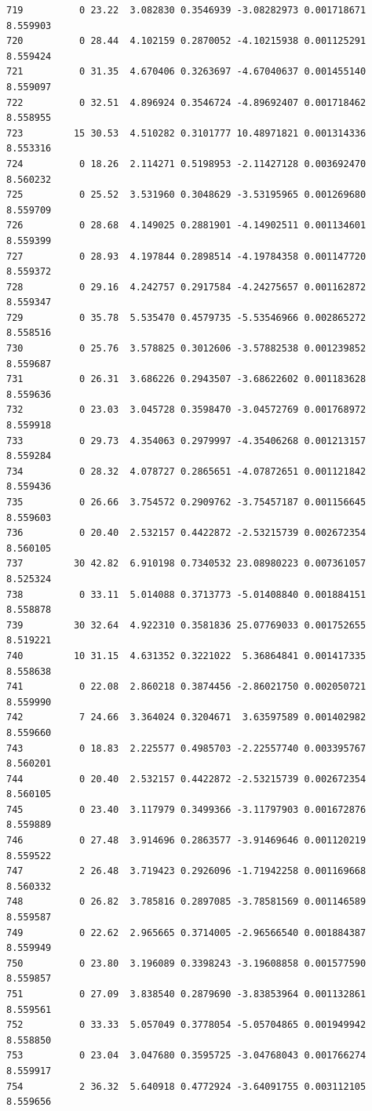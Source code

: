 \documentclass[]{book}
\theoremstyle{definition}
\theoremstyle{definition}
\theoremstyle{definition}
\theoremstyle{remark}
\begin{document}
\begin{verbatim}
719          0 23.22  3.082830 0.3546939 -3.08282973 0.001718671 8.559903
720          0 28.44  4.102159 0.2870052 -4.10215938 0.001125291 8.559424
721          0 31.35  4.670406 0.3263697 -4.67040637 0.001455140 8.559097
722          0 32.51  4.896924 0.3546724 -4.89692407 0.001718462 8.558955
723         15 30.53  4.510282 0.3101777 10.48971821 0.001314336 8.553316
724          0 18.26  2.114271 0.5198953 -2.11427128 0.003692470 8.560232
725          0 25.52  3.531960 0.3048629 -3.53195965 0.001269680 8.559709
726          0 28.68  4.149025 0.2881901 -4.14902511 0.001134601 8.559399
727          0 28.93  4.197844 0.2898514 -4.19784358 0.001147720 8.559372
728          0 29.16  4.242757 0.2917584 -4.24275657 0.001162872 8.559347
729          0 35.78  5.535470 0.4579735 -5.53546966 0.002865272 8.558516
730          0 25.76  3.578825 0.3012606 -3.57882538 0.001239852 8.559687
731          0 26.31  3.686226 0.2943507 -3.68622602 0.001183628 8.559636
732          0 23.03  3.045728 0.3598470 -3.04572769 0.001768972 8.559918
733          0 29.73  4.354063 0.2979997 -4.35406268 0.001213157 8.559284
734          0 28.32  4.078727 0.2865651 -4.07872651 0.001121842 8.559436
735          0 26.66  3.754572 0.2909762 -3.75457187 0.001156645 8.559603
736          0 20.40  2.532157 0.4422872 -2.53215739 0.002672354 8.560105
737         30 42.82  6.910198 0.7340532 23.08980223 0.007361057 8.525324
738          0 33.11  5.014088 0.3713773 -5.01408840 0.001884151 8.558878
739         30 32.64  4.922310 0.3581836 25.07769033 0.001752655 8.519221
740         10 31.15  4.631352 0.3221022  5.36864841 0.001417335 8.558638
741          0 22.08  2.860218 0.3874456 -2.86021750 0.002050721 8.559990
742          7 24.66  3.364024 0.3204671  3.63597589 0.001402982 8.559660
743          0 18.83  2.225577 0.4985703 -2.22557740 0.003395767 8.560201
744          0 20.40  2.532157 0.4422872 -2.53215739 0.002672354 8.560105
745          0 23.40  3.117979 0.3499366 -3.11797903 0.001672876 8.559889
746          0 27.48  3.914696 0.2863577 -3.91469646 0.001120219 8.559522
747          2 26.48  3.719423 0.2926096 -1.71942258 0.001169668 8.560332
748          0 26.82  3.785816 0.2897085 -3.78581569 0.001146589 8.559587
749          0 22.62  2.965665 0.3714005 -2.96566540 0.001884387 8.559949
750          0 23.80  3.196089 0.3398243 -3.19608858 0.001577590 8.559857
751          0 27.09  3.838540 0.2879690 -3.83853964 0.001132861 8.559561
752          0 33.33  5.057049 0.3778054 -5.05704865 0.001949942 8.558850
753          0 23.04  3.047680 0.3595725 -3.04768043 0.001766274 8.559917
754          2 36.32  5.640918 0.4772924 -3.64091755 0.003112105 8.559656

\end{verbatim}
\end{document}
